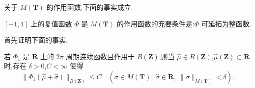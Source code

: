 关于 $M(\mathbf{T})$ 的作用函数,下面的事实成立.

\begin{theorem}\label{thm:3.5.12}
$[-1, 1]$ 上的复值函数 $\Phi$ 是 $M(\mathbf{T})$ 的作用函数的充要条件是:$\Phi$ 可延拓为整函数.
\end{theorem}

首先证明下面的事实.

\begin{lemma}\label{lem:3.5.13}
若 $\Phi_{1}$ 是 $\mathbf{R}$ 上的 $2\pi$ 周期连续函数且作用于 $B(\mathbf{Z})$,则当 $\widehat{\mu} \in B(\mathbf{Z})$,$\widehat{\mu}(\mathbf{Z}) \subset \mathbf{R}$ 时,存在 $\delta > 0$,$C < \infty$ 使得
\begin{equation*}
\|\Phi_{1}(\widehat{\mu} + \widehat{\sigma})\|_{B(\mathbf{Z})} \leq C \quad (\sigma \in M(\mathbf{T}),\ \widehat{\sigma} \in \mathbf{R},\ \|\sigma\|_{M(\mathbf{T})} < \delta).
\end{equation*}
\end{lemma}

